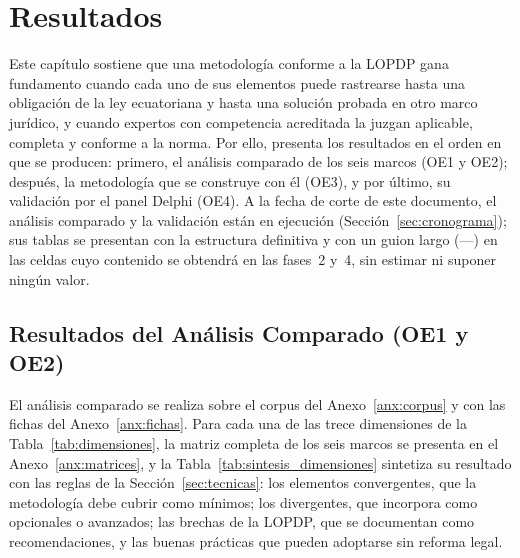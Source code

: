 \chapter{Resultados}
\label{chap:resultados}

Este capítulo sostiene que una metodología conforme a la LOPDP gana fundamento cuando cada uno de sus elementos puede rastrearse hasta una obligación de la ley ecuatoriana y hasta una solución probada en otro marco jurídico, y cuando expertos con competencia acreditada la juzgan aplicable, completa y conforme a la norma. Por ello, presenta los resultados en el orden en que se producen: primero, el análisis comparado de los seis marcos (OE1 y OE2); después, la metodología que se construye con él (OE3), y por último, su validación por el panel Delphi (OE4). A la fecha de corte de este documento, el análisis comparado y la validación están en ejecución (Sección~\ref{sec:cronograma}); sus tablas se presentan con la estructura definitiva y con un guion largo (---) en las celdas cuyo contenido se obtendrá en las fases~2 y~4, sin estimar ni suponer ningún valor.

\section{Resultados del Análisis Comparado (OE1 y OE2)}
\label{sec:res_comparado}

El análisis comparado se realiza sobre el corpus del Anexo~\ref{anx:corpus} y con las fichas del Anexo~\ref{anx:fichas}. Para cada una de las trece dimensiones de la Tabla~\ref{tab:dimensiones}, la matriz completa de los seis marcos se presenta en el Anexo~\ref{anx:matrices}, y la Tabla~\ref{tab:sintesis_dimensiones} sintetiza su resultado con las reglas de la Sección~\ref{sec:tecnicas}: los elementos convergentes, que la metodología debe cubrir como mínimos; los divergentes, que incorpora como opcionales o avanzados; las brechas de la LOPDP, que se documentan como recomendaciones, y las buenas prácticas que pueden adoptarse sin reforma legal.

